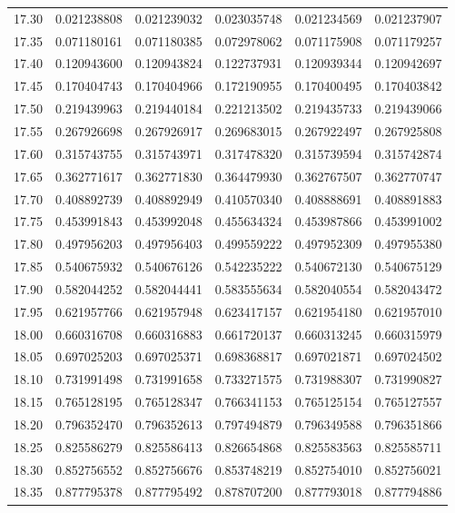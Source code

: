 \documentclass[11pt,a4paper]{article}
\begin{document}
\begin{longtable}{rrrrrr}
17.30 & 0.021238808 & 0.021239032 & 0.023035748 & 0.021234569 & 0.021237907 \\
17.35 & 0.071180161 & 0.071180385 & 0.072978062 & 0.071175908 & 0.071179257 \\
17.40 & 0.120943600 & 0.120943824 & 0.122737931 & 0.120939344 & 0.120942697 \\
17.45 & 0.170404743 & 0.170404966 & 0.172190955 & 0.170400495 & 0.170403842 \\
17.50 & 0.219439963 & 0.219440184 & 0.221213502 & 0.219435733 & 0.219439066 \\
17.55 & 0.267926698 & 0.267926917 & 0.269683015 & 0.267922497 & 0.267925808 \\
17.60 & 0.315743755 & 0.315743971 & 0.317478320 & 0.315739594 & 0.315742874 \\
17.65 & 0.362771617 & 0.362771830 & 0.364479930 & 0.362767507 & 0.362770747 \\
17.70 & 0.408892739 & 0.408892949 & 0.410570340 & 0.408888691 & 0.408891883 \\
17.75 & 0.453991843 & 0.453992048 & 0.455634324 & 0.453987866 & 0.453991002 \\
17.80 & 0.497956203 & 0.497956403 & 0.499559222 & 0.497952309 & 0.497955380 \\
17.85 & 0.540675932 & 0.540676126 & 0.542235222 & 0.540672130 & 0.540675129 \\
17.90 & 0.582044252 & 0.582044441 & 0.583555634 & 0.582040554 & 0.582043472 \\
17.95 & 0.621957766 & 0.621957948 & 0.623417157 & 0.621954180 & 0.621957010 \\
18.00 & 0.660316708 & 0.660316883 & 0.661720137 & 0.660313245 & 0.660315979 \\
18.05 & 0.697025203 & 0.697025371 & 0.698368817 & 0.697021871 & 0.697024502 \\
18.10 & 0.731991498 & 0.731991658 & 0.733271575 & 0.731988307 & 0.731990827 \\
18.15 & 0.765128195 & 0.765128347 & 0.766341153 & 0.765125154 & 0.765127557 \\
18.20 & 0.796352470 & 0.796352613 & 0.797494879 & 0.796349588 & 0.796351866 \\
18.25 & 0.825586279 & 0.825586413 & 0.826654868 & 0.825583563 & 0.825585711 \\
18.30 & 0.852756552 & 0.852756676 & 0.853748219 & 0.852754010 & 0.852756021 \\
18.35 & 0.877795378 & 0.877795492 & 0.878707200 & 0.877793018 & 0.877794886 \\

\end{longtable}
\end{document}
